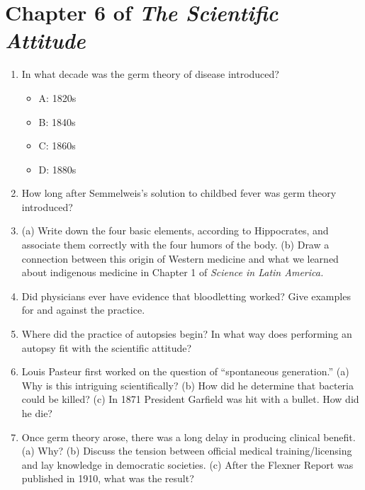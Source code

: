 \documentclass[12pt]{article}
\begin{document}
\maketitle
\small

\section{Chapter 6 of \textit{The Scientific Attitude}}

\begin{enumerate}
\item In what decade was the germ theory of disease introduced?
\begin{itemize}
\item A: 1820s
\item B: 1840s
\item C: 1860s
\item D: 1880s
\end{itemize}
\item How long after Semmelweis's solution to childbed fever was germ theory introduced? \\ \vspace{0.25cm}
\item (a) Write down the four basic elements, according to Hippocrates, and associate them correctly with the four humors of the body. (b) Draw a connection between this origin of Western medicine and what we learned about indigenous medicine in Chapter 1 of \textit{Science in Latin America.} \\ \vspace{1cm}
\item Did physicians ever have evidence that bloodletting worked? Give examples for and against the practice. \\ \vspace{0.5cm}
\item Where did the practice of autopsies begin?  In what way does performing an autopsy fit with the scientific attitude? \\ \vspace{0.5cm}
\item Louis Pasteur first worked on the question of ``spontaneous generation.'' (a) Why is this intriguing scientifically? (b) How did he determine that bacteria could be killed?  (c) In 1871 President Garfield was hit with a bullet.  How did he die? \\ \vspace{1cm}
\item Once germ theory arose, there was a long delay in producing clinical benefit.  (a) Why? (b) Discuss the tension between official medical training/licensing and lay knowledge in democratic societies. (c) After the Flexner Report was published in 1910, what was the result?
\end{enumerate}
\end{document}
